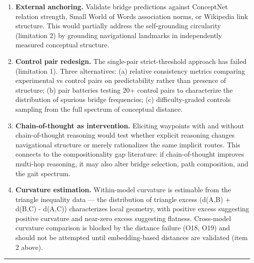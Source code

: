 \begin{enumerate}
\item
  \textbf{External anchoring.} Validate bridge predictions against ConceptNet relation strength, Small World of Words association norms, or Wikipedia link structure. This would partially address the self-grounding circularity (limitation 2) by grounding navigational landmarks in independently measured conceptual structure.
\item
  \textbf{Control pair redesign.} The single-pair strict-threshold approach has failed (limitation 1). Three alternatives: (a) relative consistency metrics comparing experimental vs control pairs on predictability rather than presence of structure; (b) pair batteries testing 20+ control pairs to characterize the distribution of spurious bridge frequencies; (c) difficulty-graded controls sampling from the full spectrum of conceptual distance.
\item
  \textbf{Chain-of-thought as intervention.} Eliciting waypoints with and without chain-of-thought reasoning would test whether explicit reasoning changes navigational structure or merely rationalizes the same implicit routes. This connects to the compositionality gap literature: if chain-of-thought improves multi-hop reasoning, it may also alter bridge selection, path composition, and the gait spectrum.
\item
  \textbf{Curvature estimation.} Within-model curvature is estimable from the triangle inequality data --- the distribution of triangle excess (d(A,B) + d(B,C) - d(A,C)) characterizes local geometry, with positive excess suggesting positive curvature and near-zero excess suggesting flatness. Cross-model curvature comparison is blocked by the distance failure (O18, O19) and should not be attempted until embedding-based distances are validated (item 2 above).
\end{enumerate}

\begin{center}\rule{0.5\linewidth}{0.5pt}\end{center}

